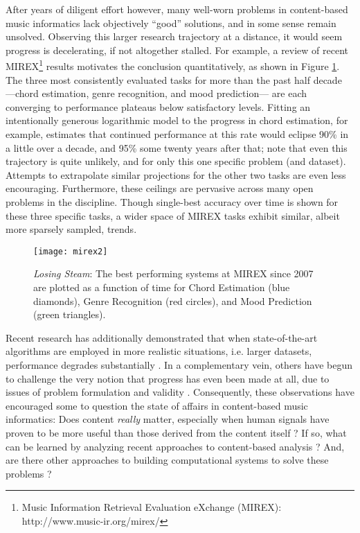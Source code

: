 After years of diligent effort however, many well-worn problems in content-based music informatics lack objectively ``good'' solutions, and in some sense remain unsolved.
Observing this larger research trajectory at a distance, it would seem progress is decelerating, if not altogether stalled.
For example, a review of recent MIREX\footnote{Music Information Retrieval Evaluation eXchange (MIREX): {http://www.music-ir.org/mirex/}} results motivates the conclusion quantitatively, as shown in Figure \ref{fig:mirex}.
The three most consistently evaluated tasks for more than the past half decade ---chord estimation, genre recognition, and mood prediction--- are each converging to performance plateaus below satisfactory levels.
Fitting an intentionally generous logarithmic model to the progress in chord estimation, for example, estimates that continued performance at this rate would eclipse 90\% in a little over a decade, and 95\% some twenty years after that; note that even this trajectory is quite unlikely, and for only this one specific problem (and dataset).
Attempts to extrapolate similar projections for the other two tasks are even less encouraging.
Furthermore, these ceilings are pervasive across many open problems in the discipline.
Though single-best accuracy over time is shown for these three specific tasks, a wider space of MIREX tasks exhibit similar, albeit more sparsely sampled, trends.

\begin{figure}
\begin{centering}
\texttt{[image: mirex2]}
\caption{\emph{Losing Steam}: The best performing systems at MIREX since 2007 are plotted as a function of time for Chord Estimation (blue diamonds), Genre Recognition (red circles), and Mood Prediction (green triangles).}
\label{fig:mirex}
\end{centering}
\end{figure}

Recent research has additionally demonstrated that when state-of-the-art algorithms are employed in more realistic situations, i.e. larger datasets, performance degrades substantially \cite{BertinMahieux2012}.
In a complementary vein, others have begun to challenge the very notion that progress has even been made at all, due to issues of problem formulation and validity \cite{Sturm2013}.
Consequently, these observations have encouraged some to question the state of affairs in content-based music informatics:
Does content \emph{really} matter, especially when human signals have proven to be more useful than those derived from the content itself \cite{Slaney2011}?
If so, what can be learned by analyzing recent approaches to content-based analysis \cite{Flexer2012}?
And, are there other approaches to building computational systems to solve these problems \cite{Humphrey2012a}?

